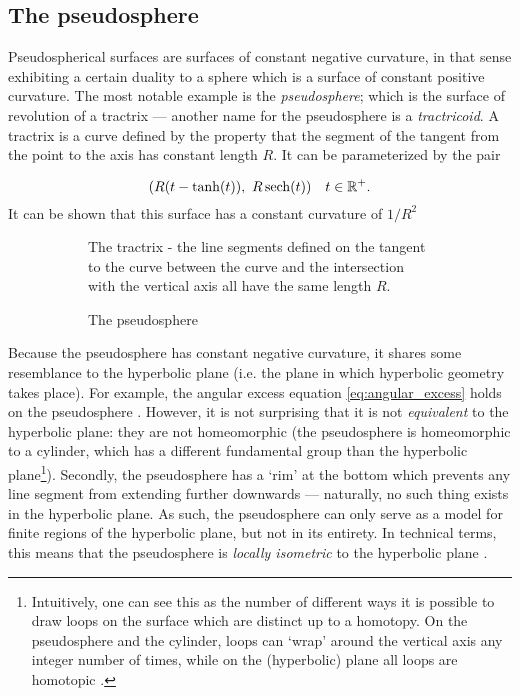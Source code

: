 \subsection{The pseudosphere}
Pseudospherical surfaces are surfaces of constant negative curvature, in that sense exhibiting a certain duality to a sphere which is a surface of constant positive curvature. The most notable example is the \emph{pseudosphere}; which is the surface of revolution of a tractrix --- another name for the pseudosphere is a \emph{tractricoid}. A tractrix is a curve defined by the property that the segment of the tangent from the point to the axis has constant length \(R\). It can be parameterized by the pair


    \[ 
        \qty(R(t - \tanh(t)),\ R\sech(t)) \quad t \in \real^+.
    \]
It can be shown that this surface has a constant curvature of $1/R^2$
\begin{figure}[ht]
    \begin{subfigure}[b]{0.5\textwidth}
        \centering
        
        \caption{The tractrix - the line segments defined on the tangent to the curve between the curve and the intersection with the vertical axis all have the same length $R$.}
        \label{fig:tractrix}
    \end{subfigure}
    \begin{subfigure}[b]{0.45\textwidth}
        \centering
        
        \caption{The pseudosphere}
        \label{fig:pseudosphere}
    \end{subfigure}
    \caption{}
\end{figure}
Because the pseudosphere has constant negative curvature, it shares some resemblance to the hyperbolic plane (i.e. the plane in which hyperbolic geometry takes place). For example, the angular excess equation \cref{eq:angular_excess} holds on the pseudosphere \cite{Needham1997}. However, it is not surprising that it is not \emph{equivalent} to the hyperbolic plane: they are not homeomorphic (the pseudosphere is homeomorphic to a cylinder, which has a different fundamental group than the hyperbolic plane\footnote{Intuitively, one can see this as the number of different ways it is possible to draw loops on the surface which are distinct up to a homotopy. On the pseudosphere and the cylinder, loops can `wrap' around the vertical axis any integer number of times, while on the (hyperbolic) plane all loops are homotopic \cite{Lee2000}.}). Secondly, the pseudosphere has a `rim' at the bottom which prevents any line segment from extending further downwards --- naturally, no such thing exists in the hyperbolic plane. As such, the pseudosphere can only serve as a model for finite regions of the hyperbolic plane, but not in its entirety. In technical terms, this means that the pseudosphere is \emph{locally isometric} to the hyperbolic plane \cite{Ghys2010}.

